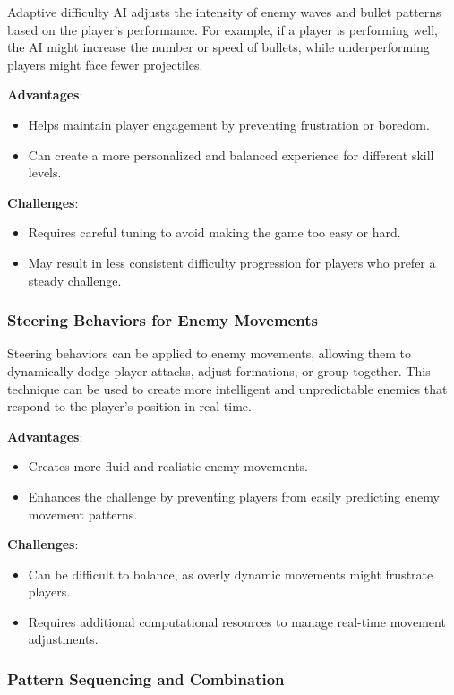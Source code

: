 \documentclass{article} %
\begin{document}
Adaptive difficulty AI adjusts the intensity of enemy waves and bullet patterns based on the player’s performance. For example, if a player is performing well, the AI might increase the number or speed of bullets, while underperforming players might face fewer projectiles.

\textbf{Advantages}:
\begin{itemize}
	\item Helps maintain player engagement by preventing frustration or boredom.
	\item Can create a more personalized and balanced experience for different skill levels.
\end{itemize}

\textbf{Challenges}:
\begin{itemize}
	\item Requires careful tuning to avoid making the game too easy or hard.
	\item May result in less consistent difficulty progression for players who prefer a steady challenge.
\end{itemize}

\subsubsection{Steering Behaviors for Enemy Movements}

Steering behaviors can be applied to enemy movements, allowing them to dynamically dodge player attacks, adjust formations, or group together. This technique can be used to create more intelligent and unpredictable enemies that respond to the player's position in real time.

\textbf{Advantages}:
\begin{itemize}
	\item Creates more fluid and realistic enemy movements.
	\item Enhances the challenge by preventing players from easily predicting enemy movement patterns.
\end{itemize}

\textbf{Challenges}:
\begin{itemize}
	\item Can be difficult to balance, as overly dynamic movements might frustrate players.
	\item Requires additional computational resources to manage real-time movement adjustments.
\end{itemize}

\subsubsection{Pattern Sequencing and Combination}
\end{document}

